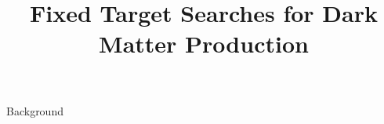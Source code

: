 \documentclass[aspectratio=169]{beamer}
\title[Fixed Target Searches]{Fixed Target Searches for Dark Matter Production}
\begin{document}
\begin{frame}
  \maketitle
\end{frame}

\begin{frame}{Background}
\end{frame}



\begin{backup}

\end{backup}
\end{document}
